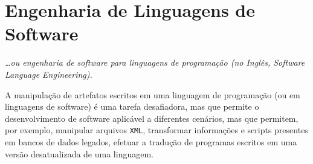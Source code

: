 

\section{Engenharia de Linguagens de Software}\label{sec:softEng}


\begin{flushright}
\emph{
\ldots ou engenharia de software para linguagens de programa\c c\~{a}o 
(no Ingl\^{e}s, Software Language Engineering).}
\end{flushright}

A manipula\c{c}\~{a}o de artefatos escritos em 
uma linguagem de programa\c{c}\~{a}o (ou em linguagens de software) 
\'{e} uma tarefa desafiadora, mas que permite o desenvolvimento 
de software aplic\'{a}vel a diferentes cen\'{a}rios, mas que permitem, por exemplo, 
manipular arquivos \texttt{XML}, transformar 
informa\c c\~{o}es e scripts presentes 
em bancos de dados legados, efetuar a tradu\c c\~{a}o de programas 
escritos em uma vers\~{a}o desatualizada de uma linguagem. 

